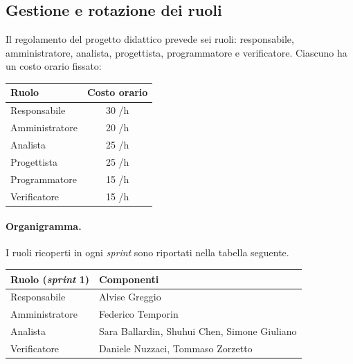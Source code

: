 \documentclass[11pt, a4paper]{article}
\begin{document}
	\subsection{Gestione e rotazione dei ruoli}
	Il regolamento del progetto didattico prevede sei ruoli: responsabile, amministratore, analista, progettista, programmatore e verificatore. Ciascuno ha un costo orario fissato:
	\begin{center}
		\renewcommand{\arraystretch}{1.3}
		\begin{tabular}{|l|c|}
			\hline
			\rowcolor{gray!10} \textbf{Ruolo} & \textbf{Costo orario} \\ \hline
			Responsabile   & 30 \texteuro/h \\ \hline
			Amministratore & 20 \texteuro/h \\ \hline
			Analista       & 25 \texteuro/h \\ \hline
			Progettista    & 25 \texteuro/h \\ \hline
			Programmatore  & 15 \texteuro/h \\ \hline
			Verificatore   & 15 \texteuro/h \\ \hline
		\end{tabular}
	\end{center}
	
	\paragraph{Organigramma.} I ruoli ricoperti in ogni \textit{sprint} sono riportati nella tabella seguente.
	\begin{center}
		\renewcommand{\arraystretch}{1.3}
		\begin{tabularx}{\textwidth}{|l|X|}
			\hline
			\rowcolor{gray!10} \textbf{Ruolo (\textit{sprint} 1)} & \textbf{Componenti} \\ \hline
			Responsabile   & Alvise Greggio \\ \hline
			Amministratore & Federico Temporin \\ \hline
			Analista       & Sara Ballardin, Shuhui Chen, Simone Giuliano \\ \hline
			Verificatore   & Daniele Nuzzaci, Tommaso Zorzetto \\ \hline
		\end{tabularx}
	\end{center}
	
\end{document}
